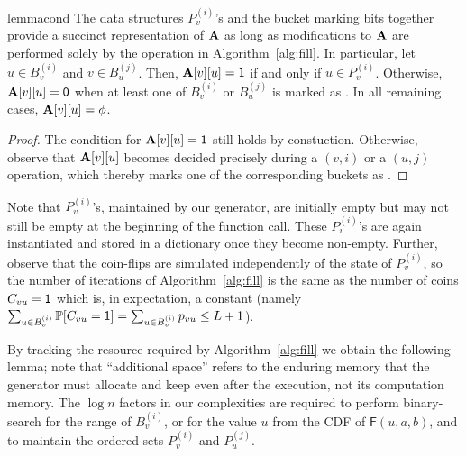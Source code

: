 \begin{restatable}{lemma}{cond}\label{lem:cond-0-fill}
The data structures $P_v^{(i)}$'s and the bucket marking bits together provide a succinct representation of $\mathbf{A}$ as long as modifications to $\mathbf{A}$ are performed solely by the  operation in Algorithm~\ref{alg:fill}. In particular, let $u \in B_v^{(i)}$ and $v \in B_u^{(j)}$. Then, $\mathbf{A}[v][u]=\mathsf{1}$ if and only if $u \in P_v^{(i)}$. Otherwise, $\mathbf{A}[v][u]=\mathsf{0}$ when at least one of $B_v^{(i)}$ or $B_u^{(j)}$ is marked as \filled. In all remaining cases, $\mathbf{A}[v][u]=\phi$.
\end{restatable}
\begin{proof}
The condition for $\mathbf{A}[v][u]=\mathsf{1}$ still holds by constuction. Otherwise, observe that $\mathbf{A}[v][u]$ becomes decided precisely during a $(v,i)$ or a $(u,j)$ operation, which thereby marks one of the corresponding buckets as \filled.
\end{proof}


Note that $P_v^{(i)}$'s, maintained by our generator, are initially empty but may not still be empty at the beginning of the  function call. These $P_v^{(i)}$'s are again instantiated and stored in a dictionary once they become non-empty.
Further, observe that the coin-flips are simulated independently of the state of $P_v^{(i)}$, so the number of iterations of Algorithm~\ref{alg:fill} is the same as the number of coins $C_{vu} = \mathsf{1}$ which is, in expectation, a constant (namely $\sum_{u\in B_v^{(i)}} \mathbb P[C_{vu}=\mathsf{1}] = \sum_{u\in B_v^{(i)}} p_{vu} \leq L+1$). %



By tracking the resource required by Algorithm~\ref{alg:fill} we obtain the following lemma; note that ``additional space'' refers to the enduring memory that the generator must allocate and keep even after the execution, not its computation memory. The $\log n$ factors in our complexities are required to perform binary-search for the range of $B_v^{(i)}$, or for the value $u$ from the CDF of $\mathsf{F}(u,a,b)$, and to maintain the ordered sets $P_v^{(i)}$ and $P_u^{(j)}$.

